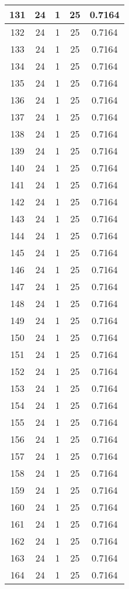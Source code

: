 \documentclass[letterpaper, 12pt]{article}
\begin{document}
\begin{longtable}{|c|c|c|c|c|}
\hline
131 & 24 & 1 & 25 & 0.7164 \\
\hline
132 & 24 & 1 & 25 & 0.7164 \\
\hline
133 & 24 & 1 & 25 & 0.7164 \\
\hline
134 & 24 & 1 & 25 & 0.7164 \\
\hline
135 & 24 & 1 & 25 & 0.7164 \\
\hline
136 & 24 & 1 & 25 & 0.7164 \\
\hline
137 & 24 & 1 & 25 & 0.7164 \\
\hline
138 & 24 & 1 & 25 & 0.7164 \\
\hline
139 & 24 & 1 & 25 & 0.7164 \\
\hline
140 & 24 & 1 & 25 & 0.7164 \\
\hline
141 & 24 & 1 & 25 & 0.7164 \\
\hline
142 & 24 & 1 & 25 & 0.7164 \\
\hline
143 & 24 & 1 & 25 & 0.7164 \\
\hline
144 & 24 & 1 & 25 & 0.7164 \\
\hline
145 & 24 & 1 & 25 & 0.7164 \\
\hline
146 & 24 & 1 & 25 & 0.7164 \\
\hline
147 & 24 & 1 & 25 & 0.7164 \\
\hline
148 & 24 & 1 & 25 & 0.7164 \\
\hline
149 & 24 & 1 & 25 & 0.7164 \\
\hline
150 & 24 & 1 & 25 & 0.7164 \\
\hline
151 & 24 & 1 & 25 & 0.7164 \\
\hline
152 & 24 & 1 & 25 & 0.7164 \\
\hline
153 & 24 & 1 & 25 & 0.7164 \\
\hline
154 & 24 & 1 & 25 & 0.7164 \\
\hline
155 & 24 & 1 & 25 & 0.7164 \\
\hline
156 & 24 & 1 & 25 & 0.7164 \\
\hline
157 & 24 & 1 & 25 & 0.7164 \\
\hline
158 & 24 & 1 & 25 & 0.7164 \\
\hline
159 & 24 & 1 & 25 & 0.7164 \\
\hline
160 & 24 & 1 & 25 & 0.7164 \\
\hline
161 & 24 & 1 & 25 & 0.7164 \\
\hline
162 & 24 & 1 & 25 & 0.7164 \\
\hline
163 & 24 & 1 & 25 & 0.7164 \\
\hline
164 & 24 & 1 & 25 & 0.7164 \\

\end{longtable}
\end{document}
